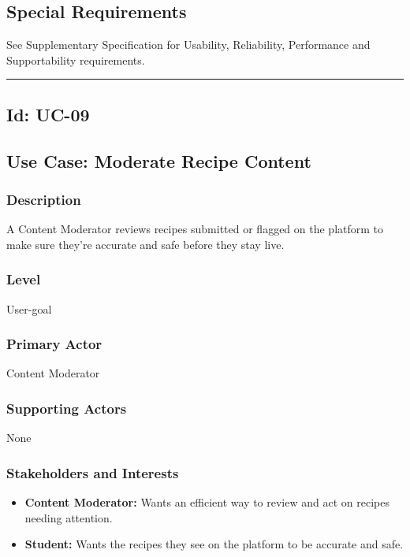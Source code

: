 \documentclass[10pt,letterpaper]{article}
\newcommand{\ucseparator}{\vspace{1em}\noindent\rule{\linewidth}{0.4pt}\vspace{1.5em}}
\begin{document}
\subsection*{Special Requirements}
See Supplementary Specification for Usability, Reliability, Performance and Supportability requirements.


\ucseparator

\subsection*{Id: UC-09}

\subsection*{Use Case: Moderate Recipe Content}

\subsubsection*{Description}
A Content Moderator reviews recipes submitted or flagged on the platform to make sure they're accurate and safe before they stay live.

\subsubsection*{Level}
User-goal

\subsubsection*{Primary Actor}
Content Moderator

\subsubsection*{Supporting Actors}
None

\subsubsection*{Stakeholders and Interests}
\begin{itemize}
    \item \textbf{Content Moderator:} Wants an efficient way to review and act on recipes needing attention.
    \item \textbf{Student:} Wants the recipes they see on the platform to be accurate and safe.
\end{itemize}
\end{document}
